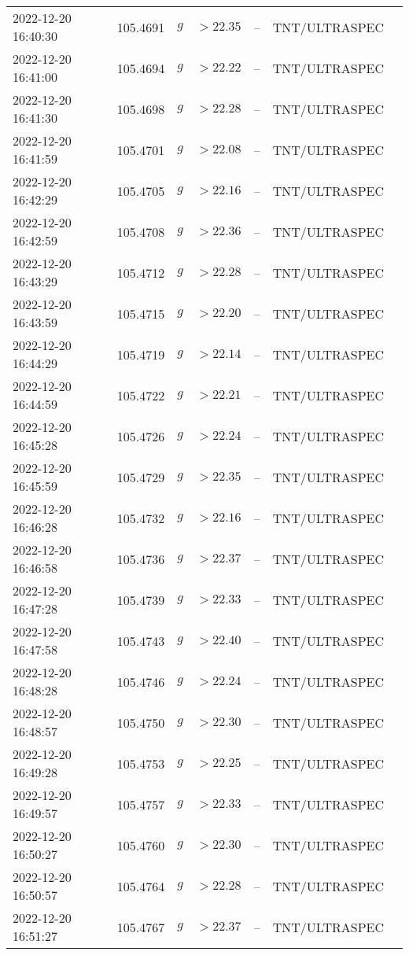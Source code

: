 \documentclass{nature_plusfigure}
\begin{document}
\begin{supplement}
\begin{center}
\begin{longtable}{lllllll}
2022-12-20 16:40:30 & 105.4691 & $g$ & $>22.35$ & -- & TNT/ULTRASPEC &  \\ 
2022-12-20 16:41:00 & 105.4694 & $g$ & $>22.22$ & -- & TNT/ULTRASPEC &  \\ 
2022-12-20 16:41:30 & 105.4698 & $g$ & $>22.28$ & -- & TNT/ULTRASPEC &  \\ 
2022-12-20 16:41:59 & 105.4701 & $g$ & $>22.08$ & -- & TNT/ULTRASPEC &  \\ 
2022-12-20 16:42:29 & 105.4705 & $g$ & $>22.16$ & -- & TNT/ULTRASPEC &  \\ 
2022-12-20 16:42:59 & 105.4708 & $g$ & $>22.36$ & -- & TNT/ULTRASPEC &  \\ 
2022-12-20 16:43:29 & 105.4712 & $g$ & $>22.28$ & -- & TNT/ULTRASPEC &  \\ 
2022-12-20 16:43:59 & 105.4715 & $g$ & $>22.20$ & -- & TNT/ULTRASPEC &  \\ 
2022-12-20 16:44:29 & 105.4719 & $g$ & $>22.14$ & -- & TNT/ULTRASPEC &  \\ 
2022-12-20 16:44:59 & 105.4722 & $g$ & $>22.21$ & -- & TNT/ULTRASPEC &  \\ 
2022-12-20 16:45:28 & 105.4726 & $g$ & $>22.24$ & -- & TNT/ULTRASPEC &  \\ 
2022-12-20 16:45:59 & 105.4729 & $g$ & $>22.35$ & -- & TNT/ULTRASPEC &  \\ 
2022-12-20 16:46:28 & 105.4732 & $g$ & $>22.16$ & -- & TNT/ULTRASPEC &  \\ 
2022-12-20 16:46:58 & 105.4736 & $g$ & $>22.37$ & -- & TNT/ULTRASPEC &  \\ 
2022-12-20 16:47:28 & 105.4739 & $g$ & $>22.33$ & -- & TNT/ULTRASPEC &  \\ 
2022-12-20 16:47:58 & 105.4743 & $g$ & $>22.40$ & -- & TNT/ULTRASPEC &  \\ 
2022-12-20 16:48:28 & 105.4746 & $g$ & $>22.24$ & -- & TNT/ULTRASPEC &  \\ 
2022-12-20 16:48:57 & 105.4750 & $g$ & $>22.30$ & -- & TNT/ULTRASPEC &  \\ 
2022-12-20 16:49:28 & 105.4753 & $g$ & $>22.25$ & -- & TNT/ULTRASPEC &  \\ 
2022-12-20 16:49:57 & 105.4757 & $g$ & $>22.33$ & -- & TNT/ULTRASPEC &  \\ 
2022-12-20 16:50:27 & 105.4760 & $g$ & $>22.30$ & -- & TNT/ULTRASPEC &  \\ 
2022-12-20 16:50:57 & 105.4764 & $g$ & $>22.28$ & -- & TNT/ULTRASPEC &  \\ 
2022-12-20 16:51:27 & 105.4767 & $g$ & $>22.37$ & -- & TNT/ULTRASPEC &  \\ 

\end{longtable}
\end{center}
\end{supplement}
\end{document}
